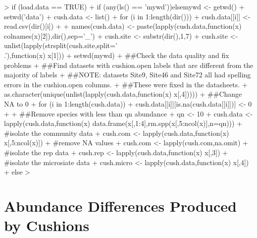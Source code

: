 \documentclass[12pt]{article}
\begin{document}
\begin{Schunk}
\begin{Sinput}
>   if (load.data == TRUE){
+     if (any(ls() == 'mywd')){}else{mywd <- getwd()}
+     setwd('data')
+     cush.data <- list()
+     for (i in 1:length(dir())){
+       cush.data[[i]] <- read.csv(dir()[i])
+     }
+     names(cush.data) <- paste(lapply(cush.data,function(x) colnames(x)[2]),dir(),sep='_')
+     cush.site <- substr(dir(),1,7)
+     cush.site <- unlist(lapply(strsplit(cush.site,split='\\.'),function(x) x[1]))
+     setwd(mywd)
+     ##Check the data quality and fix problems
+     ##Find datasets with cushion.open labels that are different from the majority of labels
+     ##NOTE: datasets Site9, Site46 and Site72 all had spelling errors in the cushion.open columns.
+     ##These were fixed in the datasheets.
+     as.character(unique(unlist(lapply(cush.data,function(x) x[,4]))))
+     ##Change NA to 0
+     for (i in 1:length(cush.data)){
+       cush.data[[i]][is.na(cush.data[[i]])] <- 0
+     }
+     ##Remove species with less than qn abundance
+     qn <- 10
+     cush.data <- lapply(cush.data,function(x) data.frame(x[,1:4],rm.spp(x[,5:ncol(x)],n=qn)))
+                                         #isolate the community data
+     cush.com <- lapply(cush.data,function(x) x[,5:ncol(x)])
+                                         #remove NA values
+     cush.com <- lapply(cush.com,na.omit)
+                                         #isolate the rep data
+     cush.rep <- lapply(cush.data,function(x) x[,3])
+                                         #isolate the microsiate data
+     cush.micro <- lapply(cush.data,function(x) x[,4])
+   }else{}
> 
\end{Sinput}
\end{Schunk}

\section{Abundance Differences Produced by Cushions}
\end{document}
